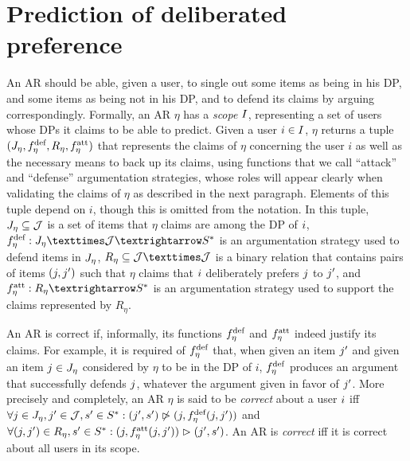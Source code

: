 \documentclass[version=3.21, pagesize, twoside=off, bibliography=totoc, DIV=calc, fontsize=12pt, a4paper, french, english]{scrartcl}
\begin{document}
\section{Prediction of deliberated preference}
\label{sec:pred}
An \ac{AR} should be able, given a user, to single out some items as being in his \ac{DP}, and some items as being not in his \ac{DP}, and to defend its claims by arguing correspondingly. 
Formally, an \ac{AR} $\eta$ has a \emph{scope} $I$, representing a set of users whose \acp{DP} it claims to be able to predict. Given a user $i \in I$, $\eta$ returns a tuple $(J_{\eta}, f^\text{def}_{\eta}, R_\eta, f^\text{att}_{\eta})$ that represents the claims of $\eta$ concerning the user $i$ as well as the necessary means to back up its claims, using functions that we call “attack” and “defense” argumentation strategies, whose roles will appear clearly when validating the claims of $\eta$ as described in the next paragraph. Elements of this tuple depend on $i$, though this is omitted from the notation. In this tuple, $J_{\eta} \subseteq \mathcal{J}$ is a set of items that $\eta$ claims are among the \ac{DP} of $i$, $\mdef: \mitems × \allitems → \allargs$ is an argumentation strategy  used to defend items in $J_{\eta}$, $R_\eta \subseteq \allitems × \allitems$ is a binary relation that contains pairs of items $(j, j')$ such that $\eta$ claims that $i$ deliberately prefers $j$ to $j'$, and $\matt: R_\eta → \allargs$ is an argumentation strategy used to support the claims represented by $R_\eta$. 

An \ac{AR} is correct if, informally, its functions $f^\text{def}_{\eta}$ and $f^\text{att}_{\eta}$ indeed justify its claims. For example, it is required of $f^\text{def}_{\eta}$ that, when given an item $j'$ and given an item $j \in J_{\eta}$ considered by $\eta$ to be in the \ac{DP} of $i$, $f^\text{def}_{\eta}$ produces an argument that successfully defends $j$, whatever the argument given in favor of $j'$. More precisely and completely, an \ac{AR} $\eta$ is said to be \emph{correct} about a user $i$ iff $\forall j \in J_{\eta}, j' \in \mathcal{J}, s' \in S^*: (j', s') \not\vartriangleright (j, f^\text{def}_{\eta}(j, j'))$ and $\forall (j, j') \in R_\eta, s' \in S^*: (j, f^\text{att}_{\eta}(j, j')) \vartriangleright (j', s')$. An \ac{AR} is \emph{correct} iff it is correct about all users in its scope. 
\end{document}
